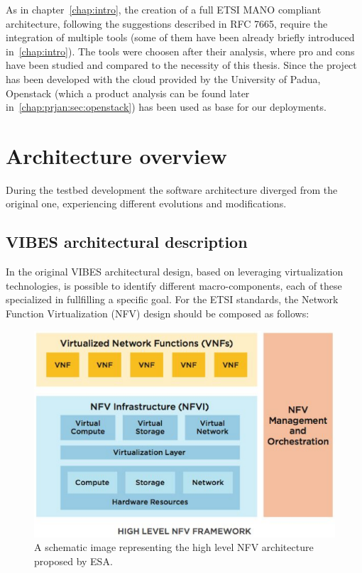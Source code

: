 \documentclass[10pt]{book}
\begin{document}
As in chapter~\ref{chap:intro}, the creation of a full ETSI MANO compliant
architecture, following the suggestions described in RFC 7665, require the
integration of multiple tools (some of them have been already briefly introduced
in~\ref{chap:intro}). The tools were choosen after their analysis, where pro and
cons have been studied and compared to the necessity of this thesis. Since the
project has been developed with the cloud provided by the University of Padua,
Openstack (which a product analysis can be found later
in~\ref{chap:prjan:sec:openstack}) has been used as base for our deployments.

\section{Architecture overview}

During the testbed development the software architecture diverged from the
original one, experiencing different evolutions and modifications.

\subsection{VIBES architectural description}

In the original VIBES architectural design, based on leveraging virtualization
technologies, is possible to identify different macro-components, each of these
specialized in fullfilling a specific goal. For the ETSI standards, the Network
Function Virtualization (NFV) design should be composed as follows:
\begin{figure}[t]
 \centering \includegraphics[scale=2]{etsi_arch}
 \caption{A schematic image representing the high level NFV architecture
   proposed by ESA.}
 \label{chap:prjan:img:etsi_arch}
\end{figure}
\end{document}
